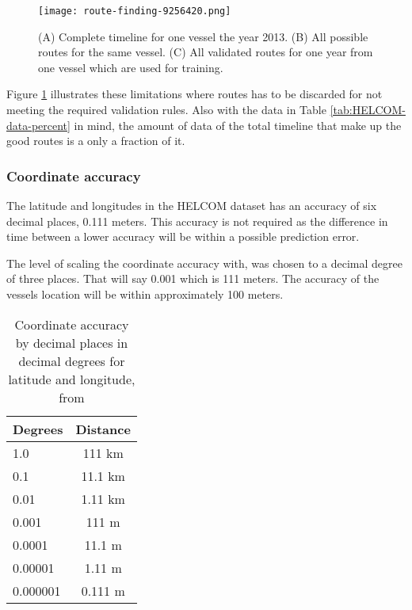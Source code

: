\documentclass[../main.tex]{subfiles}
\begin{document}
\begin{figure}[H]
	\centering
	\texttt{[image: route-finding-9256420.png]}
	\caption{(A) Complete timeline for one vessel the year 2013. (B) All possible routes for the same vessel. (C) All validated routes for one year from one vessel which are used for training. }
	\label{fig:route-finding}
\end{figure}

Figure \ref{fig:route-finding} illustrates these limitations where routes has to be discarded for not meeting the required validation rules. Also with the data in Table \ref{tab:HELCOM-data-percent} in mind, the amount of data of the total timeline that make up the good routes is a only a fraction of it.

\subsubsection{Coordinate accuracy}

The latitude and longitudes in the HELCOM dataset has an accuracy of six decimal places, 0.111 meters. This accuracy is not required as the difference in time between a lower accuracy will be within a possible prediction error.

The level of scaling the coordinate accuracy with, was chosen to a decimal degree of three places. That will say 0.001 which is 111 meters. The accuracy of the vessels location will be within approximately 100 meters.

\begin{table}[H]
\centering
\begin{tabular}{|l|c|}
\hline
\rowcolor[HTML]{C0C0C0} 
\textbf{Degrees} & \multicolumn{1}{l|}{\cellcolor[HTML]{C0C0C0}\textbf{Distance}} \\ \hline
1.0              & 111 km                                                         \\ \hline
0.1              & 11.1 km                                                        \\ \hline
0.01             & 1.11 km                                                        \\ \hline
0.001            & 111 m                                                          \\ \hline
0.0001           & 11.1 m                                                         \\ \hline
0.00001          & 1.11 m                                                         \\ \hline
0.000001          & 0.111 m                                                         \\ \hline
\end{tabular}
\caption{Coordinate accuracy by decimal places in decimal degrees for latitude and longitude, from \cite{GIS_2011}}
\label{tab:gis-accuracy}
\end{table}
\end{document}
